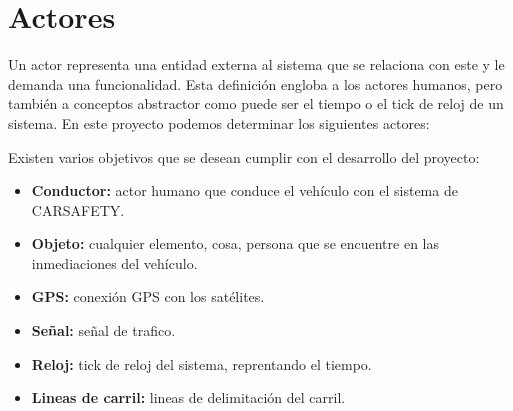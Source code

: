 \section{Actores}

\par Un actor representa una entidad externa al sistema que se relaciona con este y le demanda una funcionalidad. Esta definición engloba a los actores humanos, pero también a conceptos abstractor como puede ser el tiempo o el tick de reloj de un sistema. En este proyecto podemos determinar los siguientes actores:
\par Existen varios objetivos que se desean cumplir con el desarrollo del proyecto:

\begin{itemize}[-]
\item \textbf{Conductor:} actor humano que conduce el vehículo con el sistema de CARSAFETY.
\item \textbf{Objeto:} cualquier elemento, cosa, persona que se encuentre en las inmediaciones del vehículo.
\item \textbf{GPS:} conexión GPS con los satélites.
\item \textbf{Señal:} señal de trafico.
\item \textbf{Reloj:} tick de reloj del sistema, reprentando el tiempo.
\item \textbf{Lineas de carril:} lineas de delimitación del carril.
\end{itemize}
